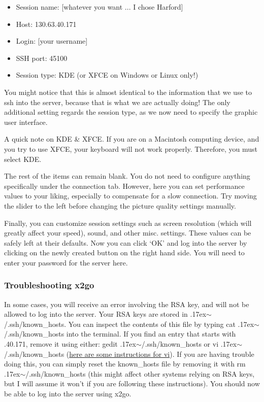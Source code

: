 \documentclass[final,titlepage,letterpaper,oneside,12pt]{article}
\renewcommand{\texttt}[2][BrickRed]{\textcolor{#1}{\ttfamily #2}}%
\newcommand{\atilde}{\raise.17ex\hbox{$\scriptstyle\mathtt{\sim}$}}
\begin{document}
\begin{itemize} \itemsep-2pt
    \item{Session name: [whatever you want ... I chose Harford]}
    \item{Host: 130.63.40.171}
    \item{Login: [your username]}
    \item{SSH port: 45100}
    \item{Session type: KDE (or XFCE on Windows or Linux only!)}
\end{itemize}

You might notice that this is almost identical to the information that we use to \texttt{ssh} into the server, because that is what we are actually doing! The only additional setting regards the \texttt{session type}, as we now need to specify the graphic user interface.

A quick note on KDE \& XFCE. If you are on a Macintosh computing device, and you try to use XFCE, your keyboard will not work properly. Therefore, you must select KDE.  

The rest of the items can remain blank. You do not need to configure anything specifically under the connection tab. However, here you can set performance values to your liking, especially to compensate for a slow connection. Try moving the slider to the left before changing the picture quality settings manually.

Finally, you can customize session settings such as screen resolution (which will greatly affect your speed), sound, and other misc. settings. These values can be safely left at their defaults. Now you can click `OK' and log into the server by clicking on the newly created button on the right hand side. You will need to enter your password for the server here.

\subsubsection{Troubleshooting x2go}

In some cases, you will receive an error involving the RSA key, and will not be allowed to log into the server. Your RSA keys are stored in \texttt{\atilde/.ssh/known\_hosts}. You can inspect the contents of this file by typing \texttt{cat \atilde/.ssh/known\_hosts} into the terminal. If you find an entry that starts with \texttt{130.63.40.171}, remove it using either: \texttt{gedit \atilde/.ssh/known\_hosts} or \texttt{vi \atilde/.ssh/known\_hosts} (\href{http://glaciated.org/vi/}{here are some instructions for vi}). If you are having trouble doing this, you can simply reset the \texttt{known\_hosts} file by removing it with \texttt{rm \atilde/.ssh/known\_hosts} (this might affect other systems relying on RSA keys, but I will assume it won't if you are following these instructions). You should now be able to log into the server using x2go.
\end{document}
